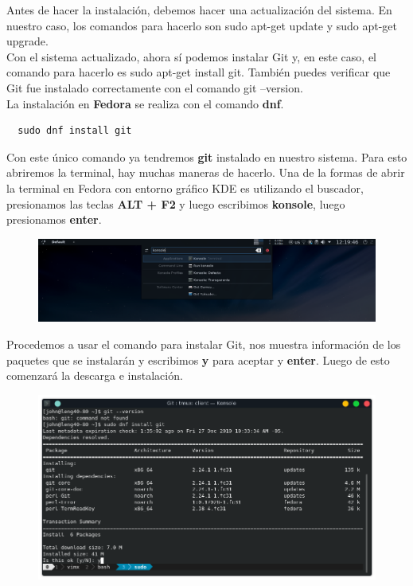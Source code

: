 \documentclass{article}
\begin{document}
Antes de hacer la instalación, debemos hacer una actualización del sistema. En
nuestro caso, los comandos para hacerlo son sudo apt-get update y sudo apt-get
upgrade.\\

Con el sistema actualizado, ahora sí podemos instalar Git y, en este caso, el
comando para hacerlo es sudo apt-get install git. También puedes verificar que
Git fue instalado correctamente con el comando git --version.\\

La instalación en \textbf{Fedora} se realiza con el comando \textbf{dnf}.

\begin{verbatim}
  sudo dnf install git
\end{verbatim}

Con este único comando ya tendremos \textbf{git} instalado en nuestro sistema.
Para esto abriremos la terminal, hay muchas maneras de hacerlo. Una de la
formas de abrir la terminal en Fedora con entorno gráfico KDE es utilizando el
buscador, presionamos las teclas \textbf{ALT + F2} y luego escribimos
\textbf{konsole}, luego presionamos \textbf{enter}.

\begin{figure}[h!]
  \centering
  \includegraphics[scale=0.5]{./Pictures/038_fedora_terminal.png}
\end{figure}

Procedemos a usar el comando para instalar Git, nos muestra información de los
paquetes que se instalarán y escribimos \textbf{y} para aceptar y
\textbf{enter}. Luego de esto comenzará la descarga e instalación.

\begin{figure}[h!]
  \centering
  \includegraphics[scale=0.75]{./Pictures/039_fedora_install_git.png}
\end{figure}
\end{document}
